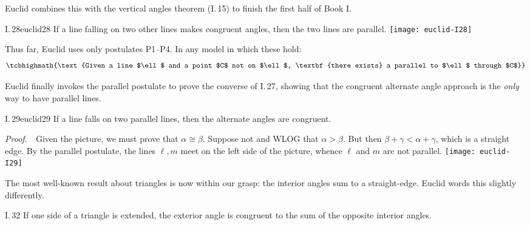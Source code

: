 Euclid combines this with the vertical angles theorem (I.\,15) to finish the first half of Book I.

\begin{cor}[lower separated=false, sidebyside, sidebyside align=top seam, sidebyside gap=0pt, righthand width=0.32\linewidth]{I.\,28}{euclid28}
	If a line falling on two other lines makes congruent angles, then the two lines are parallel.
	\tcblower
	\flushright\texttt{[image: euclid-I28]}
\end{cor}


Thus far, Euclid uses only postulates P1--P4. In any model in which these hold:
\[
	\tcbhighmath{\text{Given a line $\ell$ and a point $C$ not on $\ell$, \textbf{there exists} a parallel to $\ell$ through $C$}}
\]
\goodbreak



Euclid finally invokes the parallel postulate to prove the converse of I.\,27, showing that the congruent alternate angle approach is the \emph{only} way to have parallel lines.

\begin{thm}{I.\,29}{euclid29}
	If a line falls on two parallel lines, then the alternate angles are congruent.
\end{thm}

\begin{tcolorbox}[proofstyle,lower separated=false, sidebyside, sidebyside align=top seam, sidebyside gap=0pt, righthand width=0.37\linewidth]
	\emph{Proof.}\ \ Given the picture, we must prove that $\alpha\cong\beta$.\smallbreak
	Suppose not and WLOG that $\alpha>\beta$.\smallbreak
	But then $\beta+\gamma<\alpha+\gamma$, which is a straight edge.\smallbreak
	By the parallel postulate, the lines $\ell,m$ meet on the left side of the picture, whence $\ell$ and $m$ are not parallel.
	\tcblower
	\flushright
	\texttt{[image: euclid-I29]}\\[-10pt]\qedsymbol
\end{tcolorbox}

The most well-known result about triangles is now within our grasp: the interior angles sum to a straight-edge. Euclid words this slightly differently.

\begin{thm}{I.\,32}{}
	If one side of a triangle is extended, the exterior angle is congruent to the sum of the opposite interior angles.
\end{thm}

